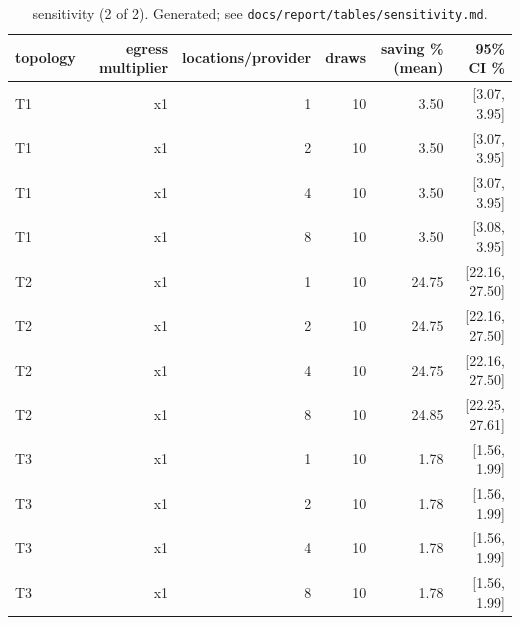 \begin{table}[t]
\centering
\small
\begin{tabular}{lrrrrr}
\toprule
topology & egress multiplier & locations/provider & draws & saving \% (mean) & 95\% CI \% \\
\midrule
T1 & x1 & 1 & 10 & 3.50 & [3.07, 3.95] \\
T1 & x1 & 2 & 10 & 3.50 & [3.07, 3.95] \\
T1 & x1 & 4 & 10 & 3.50 & [3.07, 3.95] \\
T1 & x1 & 8 & 10 & 3.50 & [3.08, 3.95] \\
T2 & x1 & 1 & 10 & 24.75 & [22.16, 27.50] \\
T2 & x1 & 2 & 10 & 24.75 & [22.16, 27.50] \\
T2 & x1 & 4 & 10 & 24.75 & [22.16, 27.50] \\
T2 & x1 & 8 & 10 & 24.85 & [22.25, 27.61] \\
T3 & x1 & 1 & 10 & 1.78 & [1.56, 1.99] \\
T3 & x1 & 2 & 10 & 1.78 & [1.56, 1.99] \\
T3 & x1 & 4 & 10 & 1.78 & [1.56, 1.99] \\
T3 & x1 & 8 & 10 & 1.78 & [1.56, 1.99] \\
\bottomrule
\end{tabular}
\caption{sensitivity (2 of 2). Generated; see \texttt{docs/report/tables/sensitivity.md}.}
\label{tab:sensitivity-2}
\end{table}
